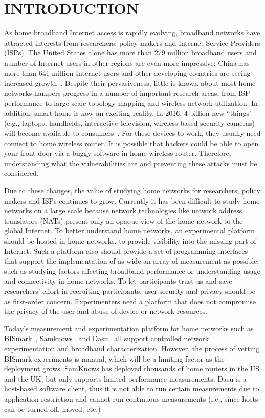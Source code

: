 \chapter{INTRODUCTION}
\label{sec.introduction}
As home broadband Internet access is rapidly evolving, broadband networks 
have attracted interests from researchers, policy makers and Internet 
Service Providers (ISPs). The United States alone has more than 279 million 
broadband users and number of Internet users in other regions are even more 
impressive: China has more than 641 million Internet users and other 
developing countries are seeing increased growth~\cite{asia}. Despite their 
pervasiveness, little is known about most home networks hampers progress in 
a number of important research areas, from ISP performance to large-scale 
topology mapping and wireless network utilization. In addition, smart home is now an exciting reality. In 2016, 4 billion new ``things" (e.g., laptops, handhelds, interactive television, wireless based security cameras) will become available to consumers~\cite{gartner}. For these devices to work, they usually need connect to home wireless router. It is possible that hackers could be able to open your front door via a buggy software in home wireless router. Therefore, understanding what the vulnerabilities are and preventing these attacks must be considered.

Due to these changes, the value of studying home networks for researchers, policy makers and ISPs continues to grow. Currently it has been difficult to study home networks on a large scale because network technologies like network address translators (NATs) present only an opaque view of the home network to the global Internet. To better understand home networks, an experimental platform should be hosted in home networks, to provide visibility into the missing part of Internet.  Such a platform also should provide a set of programming interfaces that support the implementation of as wide an array of measurement as possible, such as studying factors affecting broadband performance or understanding usage and connectivity in home networks. To let participants trust us and save researchers' effort in recruiting participants, user security and privacy should be as first-order concern. Experimenters need a platform that does not compromise the privacy of the user and abuse of device or network resources.

Today's measurement and experimentation platform for home networks such as 
BISmark~\cite{183951}, Samknows~\cite{samknows} and Dasu~\cite{
sanchez2014measurement} all support controlled network experimentation 
and broadband characterization. However, the process of vetting BISmark 
experiments is manual, which will be a limiting factor as the deployment 
grows. SamKnows has deployed thousands of home routers in the US and the UK, 
but only supports limited performance measurements. Dasu is a host-based 
software client, thus it is not able to run certain measurements due to 
application restriction and cannot run continuous measurements (i.e., since 
hosts can be turned off, moved, etc.)
 
